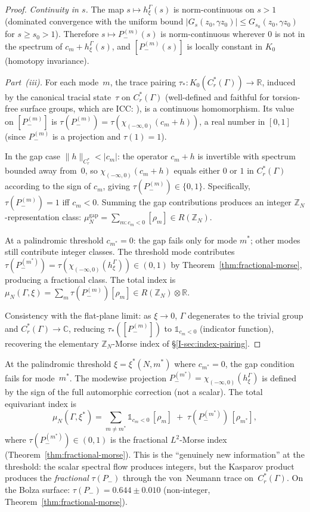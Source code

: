 \begin{proof}
\emph{Continuity in $s$.}
The map $s \mapsto h_\xi^\Gamma(s)$ is norm-continuous
on $s > 1$ (dominated convergence with the uniform
bound $|G_s(z_0,\gamma z_0)| \le G_{s_0}(z_0,\gamma z_0)$
for $s \ge s_0 > 1$).
Therefore $s \mapsto P_-^{(m)}(s)$ is norm-continuous
wherever $0$ is not in the spectrum of $c_m + h_\xi^\Gamma(s)$,
and $[P_-^{(m)}(s)]$ is locally constant in $K_0$
(homotopy invariance).

\emph{Part~(iii).}
For each mode~$m$, the trace pairing
$\tau_*\colon K_0(C^*_r(\Gamma)) \to \mathbb{R}$,
induced by the canonical tracial state~$\tau$ on
$C^*_r(\Gamma)$
(well-defined and faithful for torsion-free surface
groups, which are ICC: \citealt{Kasparov1988}),
is a continuous homomorphism.
Its value on $[P_-^{(m)}]$ is
$\tau(P_-^{(m)}) = \tau(\chi_{(-\infty,0)}(c_m + h))$,
a real number in $[0, 1]$ (since $P_-^{(m)}$ is a
projection and $\tau(1) = 1$).

In the gap case $\|h\|_{C^*_r} < |c_m|$:
the operator $c_m + h$ is invertible with spectrum
bounded away from~$0$, so $\chi_{(-\infty,0)}(c_m+h)$
equals either $0$ or $1$ in $C^*_r(\Gamma)$ according to the
sign of $c_m$, giving $\tau(P_-^{(m)}) \in \{0, 1\}$.
Specifically, $\tau(P_-^{(m)}) = 1$ iff $c_m < 0$.
Summing the gap contributions produces an integer
$\mathbb{Z}_N$-representation class:
$\mu_N^{\mathrm{gap}} = \sum_{m : c_m < 0} [\rho_m]
\in R(\mathbb{Z}_N)$.

At a palindromic threshold $c_{m^*} = 0$:
the gap fails only for mode $m^*$; other modes still
contribute integer classes.
The threshold mode contributes
$\tau(P_-^{(m^*)}) = \tau(\chi_{(-\infty,0)}(h_\xi^\Gamma))
\in (0, 1)$
by Theorem~\ref{thm:fractional-morse},
producing a fractional class.
The total index is
$\mu_N(\Gamma, \xi) = \sum_m \tau(P_-^{(m)})[\rho_m]
\in R(\mathbb{Z}_N) \otimes \mathbb{R}$.

Consistency with the flat-plane limit: as $\xi \to 0$,
$\Gamma$ degenerates to the trivial group and
$C^*_r(\Gamma) \to \mathbb{C}$, reducing
$\tau_*([P_-^{(m)}])$ to
$\mathbb{1}_{c_m < 0}$ (indicator function), recovering
the elementary $\mathbb{Z}_N$-Morse index of
\S\ref*{I-sec:index-pairing}.
\end{proof}

\begin{corollary}
\label{cor:kk-threshold}
At the palindromic threshold $\xi = \xi^*(N, m^*)$
where $c_{m^*} = 0$, the gap condition fails for
mode~$m^*$.
The modewise projection
$P_-^{(m^*)} = \chi_{(-\infty,0)}(h_\xi^\Gamma)$
is defined by the sign of the full automorphic
correction (not a scalar).
The total equivariant index is
\[
  \mu_N(\Gamma, \xi^*)
  = \!\sum_{m \ne m^*}\!\mathbb{1}_{c_m < 0}\,[\rho_m]
  \;+\; \tau(P_-^{(m^*)})\,[\rho_{m^*}],
\]
where $\tau(P_-^{(m^*)}) \in (0, 1)$ is the fractional
$L^2$-Morse index (Theorem~\ref{thm:fractional-morse}).
This is the ``genuinely new information'' at the threshold:
the scalar spectral flow produces integers, but the
Kasparov product produces the \emph{fractional}
$\tau(P_-)$ through the von~Neumann trace on~$C^*_r(\Gamma)$.
On the Bolza surface: $\tau(P_-) = 0.644 \pm 0.010$
(non-integer, Theorem~\ref{thm:fractional-morse}).
\end{corollary}

